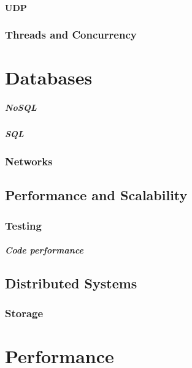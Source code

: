\subsubsection{UDP}

\subsection{Threads and Concurrency}

\chapter{Databases}

\paragraph{NoSQL}

\paragraph{SQL}

\subsection{Networks}

\section{Performance and Scalability}

\subsection{Testing}

\paragraph{Code performance}

\section{Distributed Systems}

\subsection{Storage}

\chapter{Performance}

